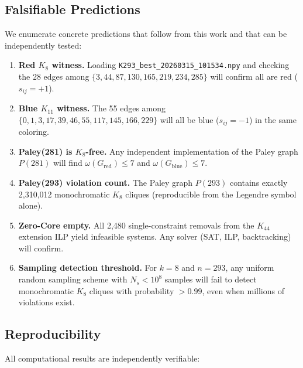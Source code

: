 \documentclass[12pt,a4paper]{article}
\theoremstyle{definition}
\theoremstyle{remark}
\newcommand{\Kn}[1]{K_{#1}}
\begin{document}
\subsection{Falsifiable Predictions}

We enumerate concrete predictions that follow from this work and that can be independently tested:

\begin{enumerate}[label=\textbf{P\arabic*.}]
\item \textbf{Red $K_8$ witness.}  Loading \texttt{K293\_best\_20260315\_101534.npy} and checking the 28 edges among $\{3, 44, 87, 130, 165, 219, 234, 285\}$ will confirm all are red ($s_{ij} = +1$).

\item \textbf{Blue $K_{11}$ witness.}  The 55 edges among $\{0, 1, 3, 17, 39, 46, 55, 117, 145, 166, 229\}$ will all be blue ($s_{ij} = -1$) in the same coloring.

\item \textbf{Paley(281) is $K_8$-free.}  Any independent implementation of the Paley graph $P(281)$ will find $\omega(G_{\text{red}}) \le 7$ and $\omega(G_{\text{blue}}) \le 7$.

\item \textbf{Paley(293) violation count.}  The Paley graph $P(293)$ contains exactly 2{,}310{,}012 monochromatic $K_8$ cliques (reproducible from the Legendre symbol alone).

\item \textbf{Zero-Core empty.}  All 2{,}480 single-constraint removals from the $\Kn{44}$ extension ILP yield infeasible systems.  Any solver (SAT, ILP, backtracking) will confirm.

\item \textbf{Sampling detection threshold.}  For $k = 8$ and $n = 293$, any uniform random sampling scheme with $N_s < 10^8$ samples will fail to detect monochromatic $K_8$ cliques with probability $> 0.99$, even when millions of violations exist.
\end{enumerate}

\subsection{Reproducibility}

All computational results are independently verifiable:
\end{document}

